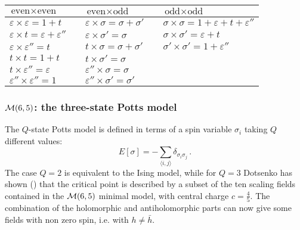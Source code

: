 \documentclass[a4paper,12pt]{report}
\begin{document}
\begin{center}
\begin{tabular}{|l l l l l|} \hline
$\textrm{even}\times \textrm{even}$ & \hspace{0.5cm} & $\textrm{even} \times \textrm{odd}$ & \hspace{0.5cm} &  $\textrm{odd} \times \textrm{odd}$ \\
\hline
$\varepsilon \times \varepsilon=1+t$ &                  & $\varepsilon \times \sigma=\sigma+\sigma'$ &    & $\sigma\times \sigma= 1+\varepsilon+t+\varepsilon''$\\
$\varepsilon \times t=\varepsilon+\varepsilon''$  &     & $\varepsilon \times \sigma'=\sigma$ &           & $\sigma\times \sigma'= \varepsilon+t$ \\
$\varepsilon \times \varepsilon''=t$ &                  & $t \times \sigma=\sigma+\sigma'$ &              & $\sigma' \times \sigma'= 1+\varepsilon''$\\
$t \times t=1+t$ &                                      & $t \times \sigma'=\sigma$ &                     &\\
$t \times \varepsilon''=\varepsilon$  &                 & $\varepsilon'' \times \sigma=\sigma$ &          &\\
$\varepsilon'' \times \varepsilon''=1$  &               & $\varepsilon'' \times \sigma'=\sigma'$ &        &\\
\hline
\end{tabular}
\end{center}




\vspace{0.5cm}


\subsubsection{${\cal M}(6,5)$: the three-state Potts model}

The $Q$-state Potts model is defined in terms of a spin variable $\sigma_{i}$ taking $Q$ different values:
\begin{equation}\label{potts}
E[\sigma]=-\sum_{\langle i,j\rangle}\delta_{\sigma_{i}\sigma_{j}} \,.
\end{equation}
The case $Q=2$ is equivalent to the Ising model, while for $Q=3$ Dotsenko has shown (\cite{M65}) that the critical
point is described by a subset of the ten scaling fields contained in the ${\cal M}(6,5)$ minimal model, with
central charge $c=\frac{4}{5}$. The combination of the holomorphic and antiholomorphic parts can now give some
fields with non zero spin, i.e. with $h\neq\bar{h}$.
\end{document}
